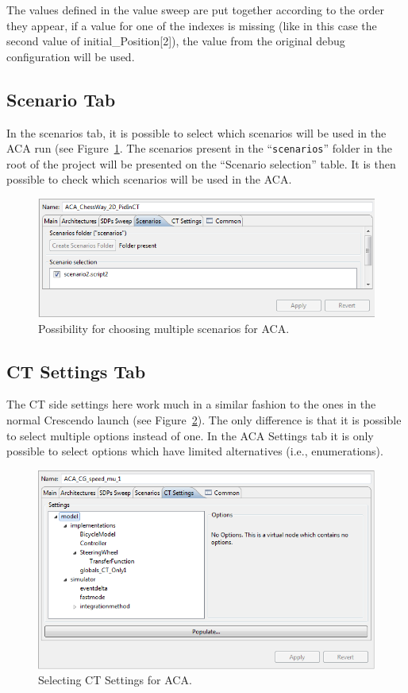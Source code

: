 \documentclass{crescendorepchap}
\begin{document}
The values defined in the value sweep are put together according to the
order they appear, if a value for one of the indexes is missing (like in this
case the second value of initial\_Position{[}2{]}), the value from the
original debug configuration will be used.

\subsection{Scenario Tab}

In the scenarios tab, it is possible to select which scenarios will be
used in the ACA run (see Figure~\ref{fig:ScenariosACATab}. 
The scenarios present in the ``\texttt{scenarios}'' folder
in the root of the project will be presented on the ``Scenario
selection'' table. It is then possible to check which scenarios will be
used in the ACA.

\begin{figure}[htbp]
\centering
\includegraphics[width=.6\textwidth]{images/ScenariosACATab.png}
\caption{Possibility for choosing multiple scenarios for ACA.\label{fig:ScenariosACATab}}
\end{figure}

\subsection{CT Settings Tab}

The CT side settings here work much in a similar fashion to the ones in
the normal Crescendo launch (see Figure~\ref{fig:SettingsACATab}). 
The only difference is that it is possible to select
multiple options instead of one. In the ACA Settings tab it is only
possible to select options which have limited alternatives (i.e.,
enumerations).

\begin{figure}[htbp]
\centering
\includegraphics[width=.6\textwidth]{images/SettingsACATab.png}
\caption{Selecting CT Settings for ACA.\label{fig:SettingsACATab}}
\end{figure}
\end{document}
